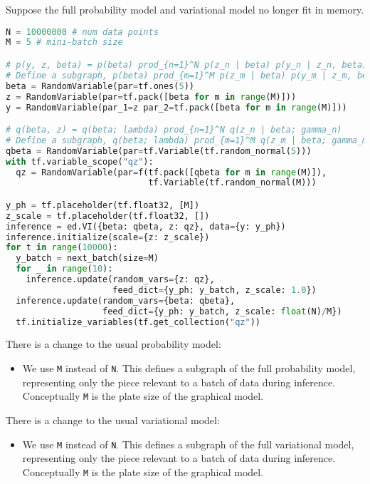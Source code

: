 Suppose the full probability model and variational model no longer fit
in memory.
\begin{lstlisting}[language=Python]
N = 10000000 # num data points
M = 5 # mini-batch size

# p(y, z, beta) = p(beta) prod_{n=1}^N p(z_n | beta) p(y_n | z_n, beta)
# Define a subgraph, p(beta) prod_{m=1}^M p(z_m | beta) p(y_m | z_m, beta)
beta = RandomVariable(par=tf.ones(5))
z = RandomVariable(par=tf.pack([beta for m in range(M)]))
y = RandomVariable(par_1=z par_2=tf.pack([beta for m in range(M)]))

# q(beta, z) = q(beta; lambda) prod_{n=1}^N q(z_n | beta; gamma_n)
# Define a subgraph, q(beta; lambda) prod_{m=1}^M q(z_m | beta; gamma_m)
qbeta = RandomVariable(par=tf.Variable(tf.random_normal(5)))
with tf.variable_scope("qz"):
  qz = RandomVariable(par=f(tf.pack([qbeta for m in range(M)]),
                            tf.Variable(tf.random_normal(M)))

y_ph = tf.placeholder(tf.float32, [M])
z_scale = tf.placeholder(tf.float32, [])
inference = ed.VI({beta: qbeta, z: qz}, data={y: y_ph})
inference.initialize(scale={z: z_scale})
for t in range(10000):
  y_batch = next_batch(size=M)
  for _ in range(10):
    inference.update(random_vars={z: qz},
                     feed_dict={y_ph: y_batch, z_scale: 1.0})
  inference.update(random_vars={beta: qbeta},
                   feed_dict={y_ph: y_batch, z_scale: float(N)/M})
  tf.initialize_variables(tf.get_collection("qz"))
\end{lstlisting}
There is a change to the usual probability model:
\begin{itemize}
\item
  We use \texttt{M} instead of \texttt{N}. This defines a subgraph of the full
  probability model, representing only the piece relevant to a batch of
  data during inference. Conceptually \texttt{M} is the plate size of the
  graphical model.
\end{itemize}

There is a change to the usual variational model:
\begin{itemize}
\item
  We use \texttt{M} instead of \texttt{N}. This defines a subgraph of the full
  variational model, representing only the piece relevant to a batch of
  data during inference. Conceptually \texttt{M} is the plate size of the
  graphical model.
\end{itemize}

